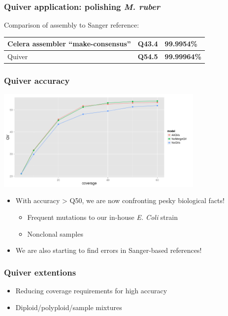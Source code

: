 \documentclass[serif,11pt]{beamer}
\begin{document}
\begin{frame}
\frametitle{Quiver application: polishing \emph{M. ruber}}
\label{sec-6-11}

   Comparison of assembly to Sanger reference:


\begin{center}
\begin{tabular}{lll}
\hline
 Celera assembler ``make-consensus''  &  Q43.4           &  99.9954\%            \\
\hline
 Quiver                               &  \textbf{Q54.5}  &  \textbf{99.99964\%}  \\
\hline
\end{tabular}
\end{center}
\end{frame}
\begin{frame}
\frametitle{Quiver accuracy}
\label{sec-6-12}

   \hspace*{0.2in}\includegraphics[width=4in]{img/quiver-accuracy-vs-coverage.png}

\begin{itemize}
\item With accuracy > Q50, we are now confronting pesky biological facts!
\begin{itemize}
\item Frequent mutations to our in-house \emph{E. Coli} strain
\item Nonclonal samples
\end{itemize}
\item We are also starting to find errors in Sanger-based references!
\end{itemize}
\end{frame}
\begin{frame}
\frametitle{Quiver extentions}
\label{sec-6-13}

\begin{itemize}
\item Reducing coverage requirements for high accuracy
\item Diploid/polyploid/sample mixtures
\end{itemize}
\end{frame}
\end{document}
